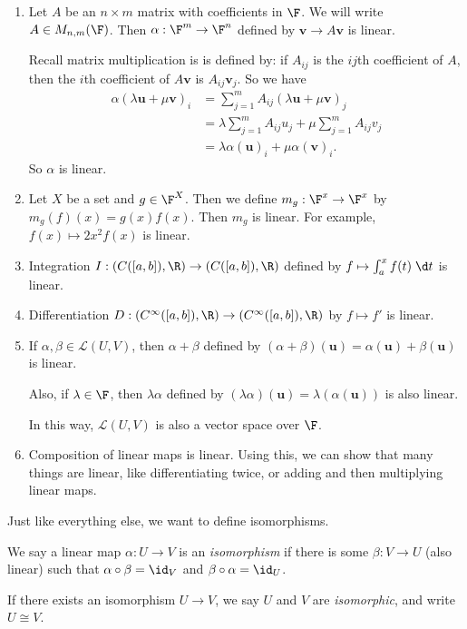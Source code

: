 \documentclass[a4paper]{article}
\begin{document}
\begin{eg}\leavevmode
  \begin{enumerate}
    \item Let $A$ be an $n\times m$ matrix with coefficients in $\F$. We will write $A\in M_{n, m}(\F)$. Then $\alpha: \F^m \to \F^n$ defined by $\mathbf{v}\to A\mathbf{v}$ is linear.

      Recall matrix multiplication is is defined by: if $A_{ij}$ is the $ij$th coefficient of $A$, then the $i$th coefficient of $A\mathbf{v}$ is $A_{ij}\mathbf{v}_j$. So we have
      \begin{align*}
        \alpha(\lambda \mathbf{u} + \mu \mathbf{v})_i &= \sum_{j = 1}^m A_{ij}(\lambda \mathbf{u} + \mu \mathbf{v})_j \\
        &= \lambda \sum_{j = 1}^m A_{ij}u_j + \mu \sum_{j = 1}^m A_{ij} v_j \\
        &= \lambda \alpha(\mathbf{u})_i + \mu \alpha(\mathbf{v})_i.
      \end{align*}
      So $\alpha$ is linear.
    \item Let $X$ be a set and $g\in \F^X$. Then we define $m_g: \F^x \to \F^x$ by $m_g(f)(x) = g(x) f(x)$. Then $m_g$ is linear. For example, $f(x) \mapsto 2x^2 f(x)$ is linear.
    \item Integration $I: (C([a, b]), \R) \to (C([a, b]), \R)$ defined by $f\mapsto \int_a^x f(t) \;\d t$ is linear.
    \item Differentiation $D: (C^\infty ([a, b]), \R) \to (C^\infty ([a, b]), \R)$ by $ f\mapsto f'$ is linear.
    \item If $\alpha, \beta\in \mathcal{L}(U, V)$, then $\alpha + \beta$ defined by $(\alpha +  \beta)(\mathbf{u}) = \alpha(\mathbf{u}) + \beta(\mathbf{u})$ is linear.

      Also, if $\lambda \in \F$, then $\lambda \alpha$ defined by $(\lambda \alpha)(\mathbf{u}) = \lambda (\alpha (\mathbf{u}))$ is also linear.

      In this way, $\mathcal{L}(U, V)$ is also a vector space over $\F$.
    \item Composition of linear maps is linear. Using this, we can show that many things are linear, like differentiating twice, or adding and then multiplying linear maps.
  \end{enumerate}
\end{eg}

Just like everything else, we want to define isomorphisms.
\begin{defi}[Isomorphism]
  We say a linear map $\alpha: U\to V$ is an \emph{isomorphism} if there is some $\beta: V\to U$ (also linear) such that $\alpha \circ \beta = \id_V$ and $\beta\circ \alpha = \id_U$.

  If there exists an isomorphism $U\to V$, we say $U$ and $V$ are \emph{isomorphic}, and write $U\cong V$.
\end{defi}
\end{document}
